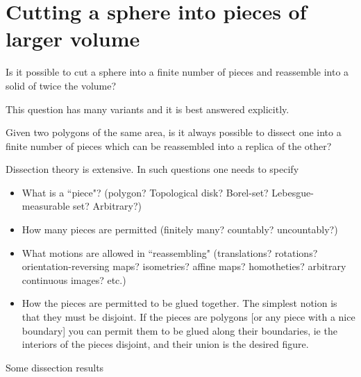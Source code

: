 \section{Cutting a sphere into pieces of larger volume}


Is it possible
    to cut a sphere into a finite number of pieces and reassemble
    into a solid of twice the volume?

  This question has many variants and it is best answered explicitly.

    Given two polygons of the same area, is it always possible to
    dissect one into a finite number of pieces which can be reassembled
    into a replica of the other?

    Dissection theory is extensive.  In such questions one needs to
    specify

\begin{itemize}
\item What is a ``piece"?  (polygon?  Topological disk?  Borel-set?
         Lebesgue-measurable set?  Arbitrary?)

    \item How many pieces are permitted (finitely many? countably? uncountably?)

    \item What motions are allowed in ``reassembling" (translations?
         rotations?  orientation-reversing maps?  isometries?
         affine maps?  homotheties?  arbitrary continuous images?  etc.)

     \item How the pieces are permitted to be glued together.  The
         simplest notion is that they must be disjoint.  If the pieces
         are polygons [or any piece with a nice boundary] you can permit
         them to be glued along their boundaries, ie the interiors of the
         pieces disjoint, and their union is the desired figure.
\end{itemize}

    Some dissection results

